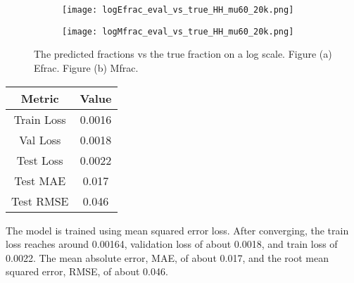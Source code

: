 \begin{figure}[h!]
\centering
\begin{subfigure}{.45\textwidth}
  \centering
  \texttt{[image: logEfrac\_eval\_vs\_true\_HH\_mu60\_20k.png]}
  \caption{}
  \label{fig:sub1}
\end{subfigure}%
\begin{subfigure}{.45\textwidth}
  \centering
  \texttt{[image: logMfrac\_eval\_vs\_true\_HH\_mu60\_20k.png]}
  \caption{}
  \label{fig:sub2}
\end{subfigure}
\caption{The predicted fractions vs the true fraction on a log scale. Figure (a) Efrac. Figure (b) Mfrac.}
\label{fig:test}
\end{figure}

\begin{center}
\begin{tabular}{||c c ||} 
 \hline
 Metric & Value  \\ [0.5ex] 
 \hline\hline
 Train Loss & 0.0016  \\ 
 \hline
 Val Loss & 0.0018 \\
 \hline
 Test Loss & 0.0022\\
 \hline
 Test MAE & 0.017 \\
 \hline
 Test RMSE & 0.046 \\ [1ex] 
 \hline
\end{tabular}
\end{center}

The model is trained using mean squared error loss. After converging, the train loss reaches around 0.00164, validation loss of about 0.0018, and train loss of 0.0022. The mean absolute error, MAE, of about 0.017, and the root mean squared error, RMSE, of about 0.046.

